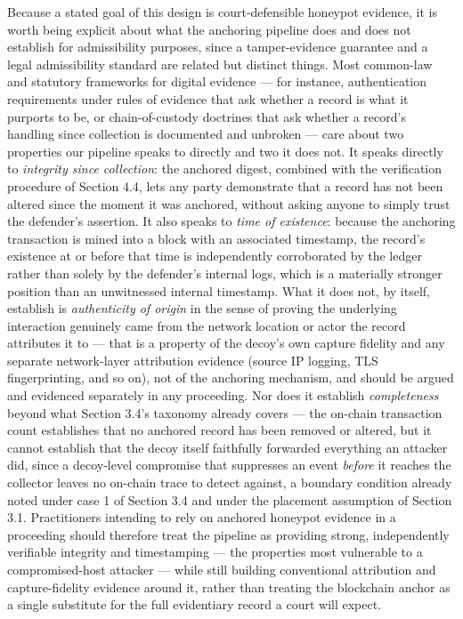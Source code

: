 \documentclass[journal]{IEEEtran}
\begin{document}
Because a stated goal of this design is court-defensible honeypot evidence, it is worth being explicit about what the anchoring pipeline does and does not establish for admissibility purposes, since a tamper-evidence guarantee and a legal admissibility standard are related but distinct things. Most common-law and statutory frameworks for digital evidence --- for instance, authentication requirements under rules of evidence that ask whether a record is what it purports to be, or chain-of-custody doctrines that ask whether a record's handling since collection is documented and unbroken --- care about two properties our pipeline speaks to directly and two it does not. It speaks directly to \emph{integrity since collection}: the anchored digest, combined with the verification procedure of Section 4.4, lets any party demonstrate that a record has not been altered since the moment it was anchored, without asking anyone to simply trust the defender's assertion. It also speaks to \emph{time of existence}: because the anchoring transaction is mined into a block with an associated timestamp, the record's existence at or before that time is independently corroborated by the ledger rather than solely by the defender's internal logs, which is a materially stronger position than an unwitnessed internal timestamp. What it does not, by itself, establish is \emph{authenticity of origin} in the sense of proving the underlying interaction genuinely came from the network location or actor the record attributes it to --- that is a property of the decoy's own capture fidelity and any separate network-layer attribution evidence (source IP logging, TLS fingerprinting, and so on), not of the anchoring mechanism, and should be argued and evidenced separately in any proceeding. Nor does it establish \emph{completeness} beyond what Section 3.4's taxonomy already covers --- the on-chain transaction count establishes that no anchored record has been removed or altered, but it cannot establish that the decoy itself faithfully forwarded everything an attacker did, since a decoy-level compromise that suppresses an event \emph{before} it reaches the collector leaves no on-chain trace to detect against, a boundary condition already noted under case 1 of Section 3.4 and under the placement assumption of Section 3.1. Practitioners intending to rely on anchored honeypot evidence in a proceeding should therefore treat the pipeline as providing strong, independently verifiable integrity and timestamping --- the properties most vulnerable to a compromised-host attacker --- while still building conventional attribution and capture-fidelity evidence around it, rather than treating the blockchain anchor as a single substitute for the full evidentiary record a court will expect.
\end{document}
